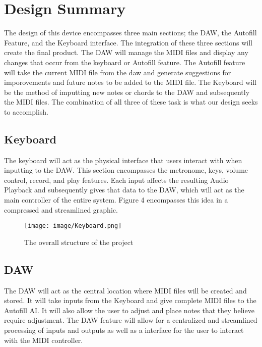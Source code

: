 \section{Design Summary}

The design of this device encompasses three main sections; the DAW, the Autofill Feature,
and the Keyboard interface. The integration of these three sections will create the final
product. The DAW will manage the MIDI files and display any changes that occur from the
keyboard or Autofill feature. The Autofill feature will take the current MIDI file from
the daw and generate suggestions for imporovements and future notes to be added to the
MIDI file. The Keyboard will be the method of imputting new notes or chords to the DAW and
subsequently the MIDI files. The combination of all three of these task is what our design
seeks to accomplish.

\newpage
\subsection{Keyboard}

The keyboard will act as the physical interface that users interact with when inputting to
the DAW. This section encompasses the metronome, keys, volume control, record, and play
features. Each input affects the resulting Audio Playback and subsequently gives that data
to the DAW, which will act as the main controller of the entire system. Figure 4
encompasses this idea in a compressed and streamlined graphic.

\begin{figure}[h!]
  \centering
  \texttt{[image: image/Keyboard.png]}
  \caption{The overall structure of the project}
  \label{fig:keyboard_diagram}
\end{figure}

\newpage
\subsection{DAW}

The DAW will act as the central location where MIDI files will be created and stored. It
will take inputs from the Keyboard and give complete MIDI files to the Autofill AI. It
will also allow the user to adjust and place notes that they believe require adjustment.
The DAW feature will allow for a centralized and streamlined processing of inputs and
outputs as well as a interface for the user to interact with the MIDI controller.

